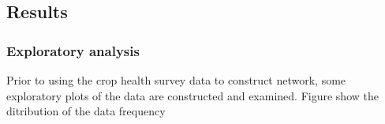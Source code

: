 \subsection{Results}

\subsubsection{Exploratory analysis}

Prior to using the crop health survey data to construct network, some exploratory plots of the data are constructed and examined. Figure show the ditribution of the data frequency 